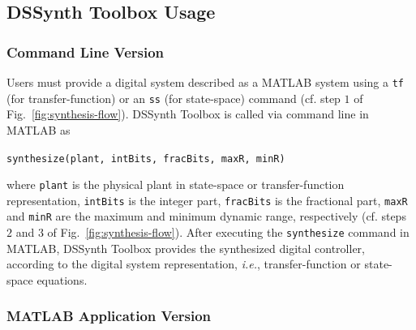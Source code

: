 \documentclass[10pt,conference]{IEEEtran}
\newcommand\tool{{DSSynth Toolbox}\xspace}
\begin{document}
\subsection{\tool Usage}

\subsubsection{Command Line Version}

Users must provide a digital system described as a MATLAB system 
using a \texttt{tf} (for transfer-function) or an \texttt{ss} (for state-space) 
command (cf. step $1$ of Fig.~\ref{fig:synthesis-flow}).
\tool is called via command line in MATLAB as 

\begin{center} 
\texttt{synthesize(plant, intBits, fracBits, maxR, minR)}
\end{center} 

\noindent where \texttt{plant} is the physical plant in state-space or transfer-function representation, 
\texttt{intBits} is the integer part, \texttt{fracBits} is the fractional part, \texttt{maxR} and \texttt{minR} 
are the maximum and minimum dynamic range, respectively (cf. steps $2$ and $3$ of Fig.~\ref{fig:synthesis-flow}).
%
After executing the \texttt{synthesize} command in MATLAB, 
\tool provides the synthesized digital controller, according to 
the digital system representation, {\it i.e.}, transfer-function or 
state-space equations. 

\subsubsection{MATLAB Application Version} 
\end{document}
